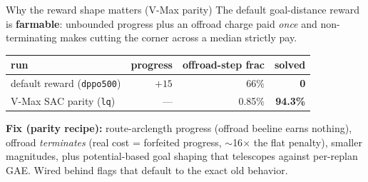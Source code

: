 \begin{frame}{Why the reward shape matters (V-Max parity)}
  \small
  The default goal-distance reward is \textbf{farmable}: unbounded progress plus
  an offroad charge paid \emph{once} and non-terminating makes cutting the corner
  across a median strictly pay.
  \begin{center}
  \begin{tabular}{@{}lrrr@{}}
    \toprule
    run & progress & offroad-step frac & solved \\
    \midrule
    default reward (\texttt{dppo500}) & $+15$ & 66\% & \textbf{0} \\
    V-Max SAC parity (\texttt{lq})    & ---   & 0.85\% & \textbf{94.3\%} \\
    \bottomrule
  \end{tabular}
  \end{center}
  \textbf{Fix (parity recipe):} route-arclength progress (offroad beeline earns
  nothing), offroad \emph{terminates} (real cost = forfeited progress, $\sim$16$\times$
  the flat penalty), smaller magnitudes, plus potential-based goal shaping that
  telescopes against per-replan GAE. Wired behind flags that default to the exact
  old behavior.
\end{frame}
